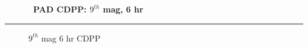 % 
% 
% 
% 
% 
%
\cleardoublepage
\begin{figure*}[h!]
  \centering
  \hfill
  {\Huge {\bf \quarter\ PAD CDPP: $9^{th}$ mag, 6 hr}}
  \hfill
\end{figure*}
\hrule
\begin{figure*}[h!]
  \centering
  \hfill
  \caption{$9^{th}$ mag 6 hr CDPP}
\end{figure*}

